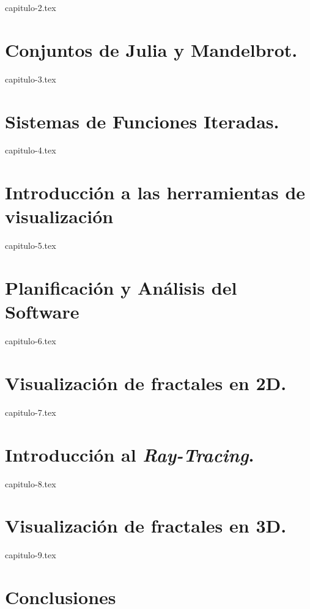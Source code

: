 \documentclass[twoside,openright,11pt]{report}
\begin{document}
{capitulo-2.tex}


\chapter{Conjuntos de Julia y Mandelbrot.}
\label{chap:Julia-Mandelbrot}

{capitulo-3.tex}

\chapter{Sistemas de Funciones Iteradas.}
\label{chap:SFI}

{capitulo-4.tex}

\chapter{Introducción a las herramientas de visualización}
\label{chap:visualizacion}

{capitulo-5.tex}

\chapter{Planificación y Análisis del Software}
\label{chap:planificacion-analisis}

{capitulo-6.tex}

\chapter{Visualización de fractales en 2D.}
\label{chap:fractales-2D}

{capitulo-7.tex}

\chapter{Introducción al \textit{Ray-Tracing}.}
\label{chap:ray-tracing}

{capitulo-8.tex}

\chapter{Visualización de fractales en 3D.}
\label{chap:fractales-3D}

{capitulo-9.tex}

\chapter*{Conclusiones}
\label{chap:conclusiones}
\end{document}
